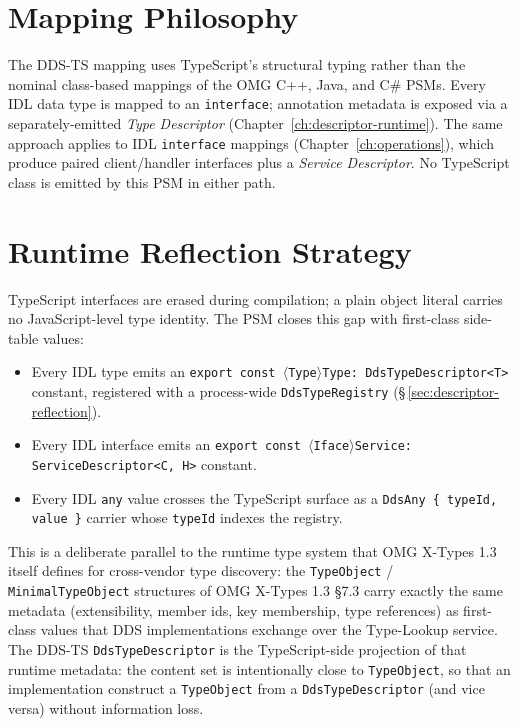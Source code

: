 \documentclass{../styles/zerodds-vendor-spec}
\begin{document}
\section{Mapping Philosophy}\label{sec:mapping-philosophy}

The DDS-TS mapping uses TypeScript's structural typing rather
than the nominal class-based mappings of the OMG C++, Java, and
C\# PSMs. Every IDL data type is mapped to an
\texttt{interface}; annotation metadata is exposed via a
separately-emitted \emph{Type Descriptor}
(Chapter~\ref{ch:descriptor-runtime}). The same approach
applies to IDL \texttt{interface} mappings
(Chapter~\ref{ch:operations}), which produce paired
client/handler interfaces plus a \emph{Service Descriptor}. No
TypeScript class is emitted by this PSM in either path.

\section{Runtime Reflection Strategy}\label{sec:reflection-strategy}

TypeScript interfaces are erased during compilation; a plain
object literal carries no JavaScript-level type identity. The
PSM closes this gap with first-class side-table values:

\begin{itemize}[noitemsep]
  \item Every IDL type emits an
        \texttt{export const $\langle$Type$\rangle$Type:\,DdsTypeDescriptor<T>}
        constant, registered with a process-wide
        \texttt{DdsTypeRegistry}
        (\S\,\ref{sec:descriptor-reflection}).
  \item Every IDL interface emits an
        \texttt{export const $\langle$Iface$\rangle$Service:\,
        ServiceDescriptor<C,\,H>} constant.
  \item Every IDL \texttt{any} value crosses the TypeScript
        surface as a \texttt{DdsAny\,\{ typeId, value \}} carrier
        whose \texttt{typeId} indexes the registry.
\end{itemize}

This is a deliberate parallel to the runtime type system that
OMG X-Types 1.3 itself defines for cross-vendor type discovery:
the \texttt{TypeObject} / \texttt{MinimalTypeObject} structures
of OMG X-Types 1.3 §7.3 carry exactly the same metadata
(extensibility, member ids, key membership, type references) as
first-class values that DDS implementations exchange over the
Type-Lookup service. The DDS-TS \texttt{DdsTypeDescriptor} is
the TypeScript-side projection of that runtime metadata: the
content set is intentionally close to \texttt{TypeObject}, so
that an implementation  construct a
\texttt{TypeObject} from a \texttt{DdsTypeDescriptor} (and vice
versa) without information loss.
\end{document}
